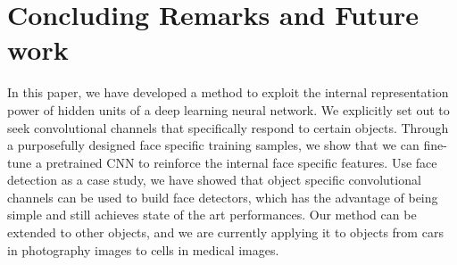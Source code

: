 \documentclass[10pt,twocolumn,letterpaper]{article}
\begin{document}
\section{Concluding Remarks and Future work}
In this paper, we have developed a method to exploit the internal representation power of hidden units of a deep learning neural network. We explicitly set out to seek convolutional channels that specifically respond to certain objects. Through a purposefully designed face specific training samples, we show that we can fine-tune a pretrained CNN to reinforce the internal face specific features. Use face detection as a case study, we have showed that object specific convolutional channels can be used to build face detectors, which has the advantage of being simple and still achieves state of the art performances. Our method can be extended to other objects, and we are currently applying it to objects from cars in photography images to cells in medical images.


{\small


}
\end{document}
